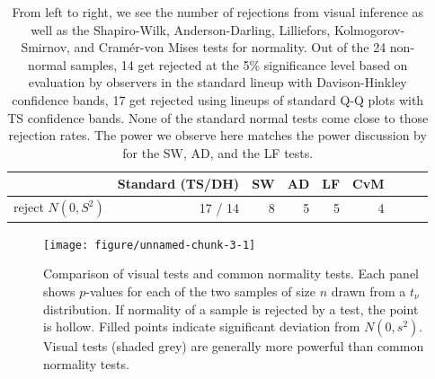 \documentclass{article}\usepackage[]{graphicx}\usepackage[]{color}
\newenvironment{knitrout}{}{} %
\newcommand{\hh}[1]{{\color{magenta} #1}}
\begin{document}
\begin{table}[ht]
\centering
\caption{\label{tab:reject}
 From left to right, we see the number of rejections from visual inference as well as the  Shapiro-Wilk, Anderson-Darling, Lilliefors,  Kolmogorov-Smirnov, and Cram\'er-von Mises tests for normality. Out of the 24 non-normal samples, 14 get rejected at the 5\% significance level based on evaluation by observers in the standard lineup with Davison-Hinkley confidence bands, 17 get rejected using lineups of standard Q-Q plots with TS confidence bands. None of the standard normal tests come close to those rejection rates. The power we observe here matches the power discussion by \citet{razali:2011} for the SW, AD, and the LF  tests. }

\begin{tabular}{rrrrrrrrr}
  \hline
 & \bf  Standard (TS/DH) & \bf SW & \bf AD & \bf LF   & \bf CvM & \\ 
  \hline
  \hline
  reject $N(0,S^2)$  & 17 / 14 &  8  & 5  &  5  & 4 & \\ 
\hline
\end{tabular}
\end{table}
\afterpage{\clearpage}

\begin{figure}
\centering
\begin{knitrout}
\color{fgcolor}
\texttt{[image: figure/unnamed-chunk-3-1]} 

\end{knitrout}
\caption{\label{fig:pvals} \hh{ Comparison of visual tests and common normality tests. Each panel shows $p$-values  for each of  the two samples of size $n$ drawn from a $t_\nu$ distribution. If normality of a sample is rejected by a test, the point is hollow. Filled points indicate significant deviation from $N(0, s^2)$. Visual tests (shaded grey) are generally  more powerful than common normality tests.} }
\end{figure}
\afterpage{\clearpage}
\end{document}
